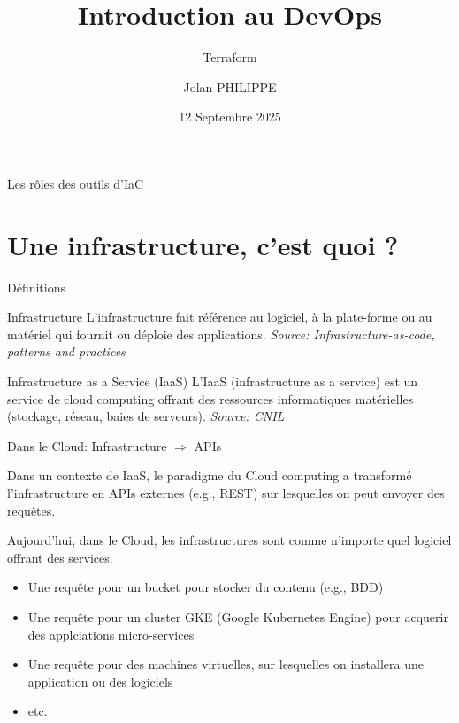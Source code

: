 \documentclass[aspectratio=169,10pt]{beamer}
\title{Introduction au DevOps}
\subtitle{Terraform}
\date{12 Septembre 2025}
\author{Jolan PHILIPPE}
\institute{Université d'Orléans}
\begin{document}
\begin{frame}
    \titlepage 
\end{frame}

\begin{frame}{Les rôles des outils d'IaC}

\hspace*{-0.7cm}


\end{frame}

\section{Une infrastructure, c'est quoi ?}

\begin{frame}{Définitions}

\begin{alertblock}{Infrastructure}
L'infrastructure fait référence au logiciel, à la plate-forme ou au matériel qui fournit ou déploie des applications. \textit{Source: Infrastructure-as-code, patterns and practices}
\end{alertblock}

\begin{alertblock}{Infrastructure as a Service (IaaS)}
L’IaaS (infrastructure as a service) est un service de cloud computing offrant des ressources informatiques matérielles (stockage, réseau, baies de serveurs). \textit{Source: CNIL}
\end{alertblock}
    
\end{frame}


\begin{frame}{Dans le Cloud: Infrastructure $\Rightarrow$ APIs}

Dans un contexte de IaaS, le paradigme du Cloud computing a transformé l'\alert{infrastructure en APIs externes} (e.g., REST) sur lesquelles on peut envoyer des requêtes.

Aujourd'hui, dans le Cloud, les infrastructures sont comme n'importe quel logiciel offrant des services.
\begin{itemize}
    \item Une requête pour un bucket pour stocker du contenu (e.g., BDD)
    \item Une requête pour un cluster GKE (Google Kubernetes Engine) pour acquerir des applciations micro-services
    \item Une requête pour des machines virtuelles, sur lesquelles on installera une application ou des logiciels
    \item etc.
\end{itemize}
    
\end{frame}
\end{document}
